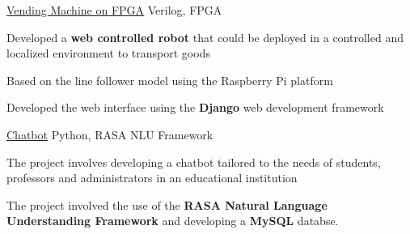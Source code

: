 \begin{cventries}
    \projects
    {} %
     {\href{}{Vending Machine on FPGA}} %
     {Verilog, FPGA} %
     {} %
     {
       \begin{cvitems} %
         \item {Developed a \textbf{web controlled robot} that could be deployed in a controlled and localized environment to transport goods}
         \item {Based on the line follower model using the Raspberry Pi platform}
         \item {Developed the web interface using the \textbf{Django} web development framework}
       \end{cvitems}
     }

  \projects
    {} %
    {\href{}{Chatbot}} %
    {Python, RASA NLU Framework} %
    {} %
    {
      \begin{cvitems} %
        \item {The project involves developing a chatbot tailored to the needs of students, professors and administrators in an educational institution}
        \item {The project involved the use of the \textbf{RASA Natural Language Understanding Framework} and developing a \textbf{MySQL} databse.}
      \end{cvitems}
    }

 


  


 


\end{cventries}
